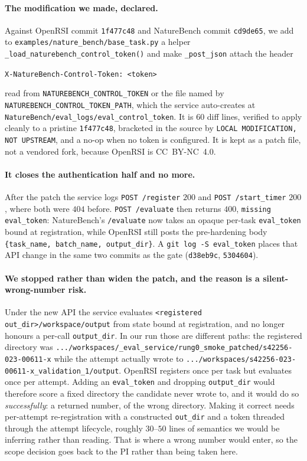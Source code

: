 \paragraph{The modification we made, declared.} Against OpenRSI commit \texttt{1f477c48}
and NatureBench commit \texttt{cd9de65}, we add to
\texttt{examples/nature\_bench/base\_task.py} a helper
\texttt{\_load\_naturebench\_control\_token()} and make \texttt{\_post\_json} attach the
header
\begin{center}
\texttt{X-NatureBench-Control-Token: <token>}
\end{center}
read from \texttt{NATUREBENCH\_CONTROL\_TOKEN} or the file named by
\texttt{NATUREBENCH\_CONTROL\_TOKEN\_PATH}, which the service auto-creates at
\texttt{NatureBench/eval\_logs/eval\_control\_token}. It is $60$ diff lines, verified to
apply cleanly to a pristine \texttt{1f477c48}, bracketed in the source by
\texttt{LOCAL MODIFICATION, NOT UPSTREAM}, and a no-op when no token is configured. It is
kept as a patch file, not a vendored fork, because OpenRSI is CC~BY-NC~4.0.

\paragraph{It closes the authentication half and no more.} After the patch the service logs
\texttt{POST /register} $200$ and \texttt{POST /start\_timer} $200$, where both were $404$
before. \texttt{POST /evaluate} then returns $400$, \texttt{missing eval\_token}:
NatureBench's \texttt{/evaluate} now takes an opaque per-task \texttt{eval\_token} bound at
registration, while OpenRSI still posts the pre-hardening body
\texttt{\{task\_name, batch\_name, output\_dir\}}. A \texttt{git log -S eval\_token} places
that API change in the same two commits as the gate (\texttt{d38eb9c}, \texttt{5304604}).

\paragraph{We stopped rather than widen the patch, and the reason is a silent-wrong-number
risk.} Under the new API the service evaluates
\texttt{<registered out\_dir>/workspace/output} from state bound at registration, and no
longer honours a per-call \texttt{output\_dir}. In our run those are different paths: the
registered directory was
\texttt{.../workspaces/\_eval\_service/rung0\_smoke\_patched/s42256-023-00611-x} while the
attempt actually wrote to
\texttt{.../workspaces/s42256-023-00611-x\_validation\_1/output}. OpenRSI registers once per
task but evaluates once per attempt. Adding an \texttt{eval\_token} and dropping
\texttt{output\_dir} would therefore score a fixed directory the candidate never wrote to,
and it would do so \emph{successfully}: a returned number, of the wrong directory. Making
it correct needs per-attempt re-registration with a constructed \texttt{out\_dir} and a
token threaded through the attempt lifecycle, roughly $30$--$50$ lines of semantics we
would be inferring rather than reading. That is where a wrong number would enter, so the
scope decision goes back to the PI rather than being taken here.

